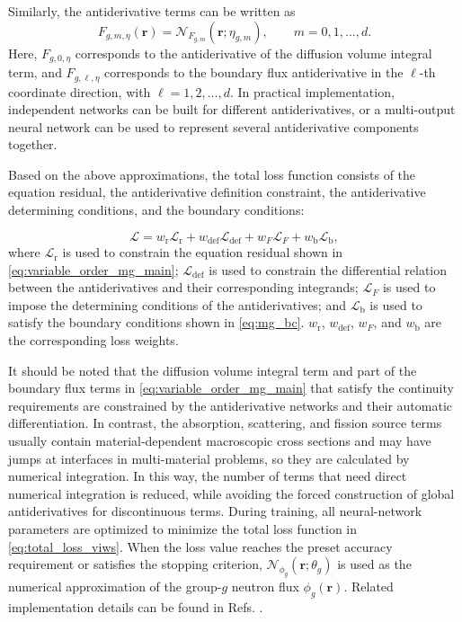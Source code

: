 \documentclass[final,3p,times,sort&compress]{elsarticle}
\begin{document}
Similarly, the antiderivative terms can be written as
\begin{equation}
F_{g,m,\eta}(\boldsymbol r)
=
\mathcal{N}_{F_{g,m}}(\boldsymbol r;\eta_{g,m}),
\qquad
m=0,1,\ldots,d .
\label{eq:nn_F_g}
\end{equation}
Here, $F_{g,0,\eta}$ corresponds to the antiderivative of the diffusion volume integral term, and $F_{g,\ell,\eta}$ corresponds to the boundary flux antiderivative in the $\ell$-th coordinate direction, with $\ell=1,2,\ldots,d$. In practical implementation, independent networks can be built for different antiderivatives, or a multi-output neural network can be used to represent several antiderivative components together.

Based on the above approximations, the total loss function consists of the equation residual, the antiderivative definition constraint, the antiderivative determining conditions, and the boundary conditions:

\begin{equation}
    \mathcal{L}
    =
    w_{\mathrm r}\mathcal{L}_{\mathrm r}
    +
    w_{\mathrm{def}}\mathcal{L}_{\mathrm{def}}
    +
    w_F\mathcal{L}_{F}
    +
    w_{\mathrm b}\mathcal{L}_{\mathrm b},
    \label{eq:total_loss_viws}
\end{equation}
where $\mathcal{L}_{\mathrm r}$ is used to constrain the equation residual shown in \cref{eq:variable_order_mg_main}; $\mathcal{L}_{\mathrm{def}}$ is used to constrain the differential relation between the antiderivatives and their corresponding integrands; $\mathcal{L}_{F}$ is used to impose the determining conditions of the antiderivatives; and $\mathcal{L}_{\mathrm b}$ is used to satisfy the boundary conditions shown in \cref{eq:mg_bc}. $w_{\mathrm r}$, $w_{\mathrm{def}}$, $w_F$, and $w_{\mathrm b}$ are the corresponding loss weights. 

It should be noted that the diffusion volume integral term and part of the boundary flux terms in \cref{eq:variable_order_mg_main} that satisfy the continuity requirements are constrained by the antiderivative networks and their automatic differentiation. In contrast, the absorption, scattering, and fission source terms usually contain material-dependent macroscopic cross sections and may have jumps at interfaces in multi-material problems, so they are calculated by numerical integration. In this way, the number of terms that need direct numerical integration is reduced, while avoiding the forced construction of global antiderivatives for discontinuous terms.
During training, all neural-network parameters are optimized to minimize the total loss function in \cref{eq:total_loss_viws}. When the loss value reaches the preset accuracy requirement or satisfies the stopping criterion, $\mathcal{N}_{\phi_g}(\boldsymbol r;\theta_g)$ is used as the numerical approximation of the group-$g$ neutron flux $\phi_g(\boldsymbol r)$. Related implementation details can be found in Refs. \cite{liu2025neutron, liu2024repeated}.
\end{document}
